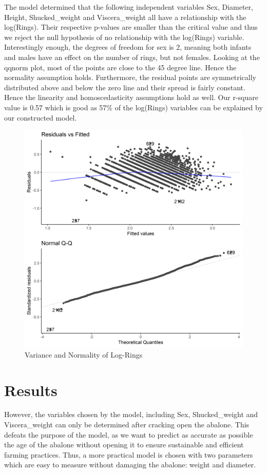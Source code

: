 \documentclass[10pt,twocolumn]{article}
\begin{document}
	The model determined that the following independent variables Sex, Diameter, Height, Shucked\_weight and Viscera\_weight all have a relationship with the log(Rings). Their respective p-values are smaller than the critical value and thus we reject the null hypothesis of no relationship with the log(Rings) variable. Interestingly enough, the degrees of freedom for sex is 2, meaning both infants and males have an effect on the number of rings, but not females. Looking at the qqnorm plot, most of the points are close to the 45 degree line. Hence the normality assumption holds. Furthermore, the residual points are symmetrically distributed above and below the zero line and their spread is fairly constant. Hence the linearity and homoscedasticity assumptions hold as well. Our r-square value is 0.57 which is good as 57\% of the log(Rings) variables can be explained by our constructed model.
	
	\begin{figure}[!htbp]
		\centering
		\includegraphics[width=0.7\linewidth]{varnorm}
		\caption{Variance and Normality of Log-Rings}
		\label{fig:varnorm}
	\end{figure}
	\vspace{-8mm}	
	
	\section{Results}
		However, the variables chosen by the model, including Sex, Shucked\_weight and Viscera\_weight can only be determined after cracking open the abalone. This defeats the purpose of the model, as we want to predict as accurate as possible the age of the abalone without opening it to ensure sustainable and efficient farming practices. Thus, a more practical model is chosen with two parameters which are easy to measure without damaging the abalone: weight and diameter. 
		
\end{document}

